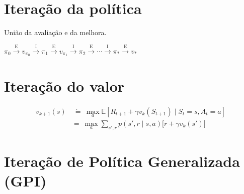 \documentclass{article}
\begin{document}
    \section{Iteração da política}
    
        União da avaliação e da melhora.
        
        \begin{center}
            \begin{math}
                \pi_0 \xrightarrow{\ \textrm{E} \ } 
                v_{\pi_0} \xrightarrow{\ \textrm{I} \ } 
                \pi_1 \xrightarrow{\ \textrm{E} \ } 
                v_{\pi_1} \xrightarrow{\ \textrm{I} \ } 
                \pi_2 \xrightarrow{\ \textrm{E} \ } 
                \cdots \xrightarrow{\ \textrm{I} \ }
                \pi_* \xrightarrow{\ \textrm{E} \ } v_{*}
            \end{math}
        \end{center}
        
    \section{Iteração do valor}
    
        \begin{equation}
            \begin{split}
                v_{k+1}(s) & \  \dot{=} \ \max_a \mathbb{E}[R_{t+1} + \gamma v_k(S_{t+1}) \mid S_t = s, A_t = a] \\
                & = \ \max_a \sum_{s',r} p(s', r \mid s, a) \Big[ r + \gamma v_k(s') \Big]
            \end{split}
        \end{equation}
    
    \section{Iteração de Política Generalizada (GPI)}
    
\end{document}
